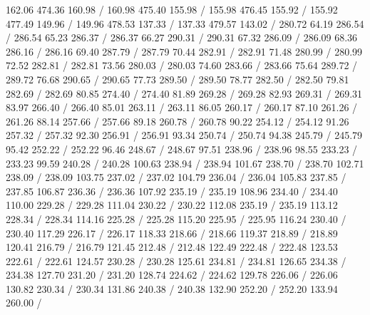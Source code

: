 { 162.06 474.36 160.98 /
 160.98 475.40 155.98 /
 155.98 476.45 155.92 /
 155.92 477.49 149.96 /
 149.96 478.53 137.33 /
 137.33 479.57 143.02 /
\setsolid
{} 280.72 64.19 286.54 /
 286.54 65.23 286.37 /
 286.37 66.27 290.31 /
 290.31 67.32 286.09 /
 286.09 68.36 286.16 /
 286.16 69.40 287.79 /
 287.79 70.44 282.91 /
 282.91 71.48 280.99 /
 280.99 72.52 282.81 /
 282.81 73.56 280.03 /
 280.03 74.60 283.66 /
 283.66 75.64 289.72 /
 289.72 76.68 290.65 /
 290.65 77.73 289.50 /
 289.50 78.77 282.50 /
 282.50 79.81 282.69 /
 282.69 80.85 274.40 /
 274.40 81.89 269.28 /
 269.28 82.93 269.31 /
 269.31 83.97 266.40 /
 266.40 85.01 263.11 /
 263.11 86.05 260.17 /
 260.17 87.10 261.26 /
 261.26 88.14 257.66 /
 257.66 89.18 260.78 /
 260.78 90.22 254.12 /
 254.12 91.26 257.32 /
 257.32 92.30 256.91 /
 256.91 93.34 250.74 /
 250.74 94.38 245.79 /
 245.79 95.42 252.22 /
 252.22 96.46 248.67 /
 248.67 97.51 238.96 /
 238.96 98.55 233.23 /
 233.23 99.59 240.28 /
 240.28 100.63 238.94 /
 238.94 101.67 238.70 /
 238.70 102.71 238.09 /
 238.09 103.75 237.02 /
 237.02 104.79 236.04 /
 236.04 105.83 237.85 /
 237.85 106.87 236.36 /
 236.36 107.92 235.19 /
 235.19 108.96 234.40 /
 234.40 110.00 229.28 /
 229.28 111.04 230.22 /
 230.22 112.08 235.19 /
 235.19 113.12 228.34 /
 228.34 114.16 225.28 /
 225.28 115.20 225.95 /
 225.95 116.24 230.40 /
 230.40 117.29 226.17 /
 226.17 118.33 218.66 /
 218.66 119.37 218.89 /
 218.89 120.41 216.79 /
 216.79 121.45 212.48 /
 212.48 122.49 222.48 /
 222.48 123.53 222.61 /
 222.61 124.57 230.28 /
 230.28 125.61 234.81 /
 234.81 126.65 234.38 /
 234.38 127.70 231.20 /
 231.20 128.74 224.62 /
 224.62 129.78 226.06 /
 226.06 130.82 230.34 /
 230.34 131.86 240.38 /
 240.38 132.90 252.20 /
 252.20 133.94 260.00 /
}
